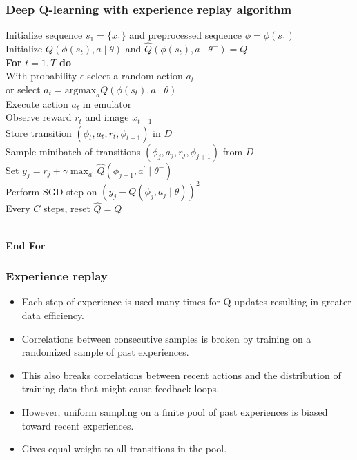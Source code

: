 \documentclass{beamer}
\begin{document}
\begin{frame}
  \frametitle{Deep Q-learning with experience replay algorithm}
  Initialize sequence \(s_1=\{x_1\}\) and preprocessed sequence \(\phi=\phi(s_1)\) \\
  Initialize \(Q(\phi(s_t),a\mid\theta)\) and \(\hat{Q}(\phi(s_t),a\mid\theta^-)=Q\) \\
  \textbf{For} \(t=1, T\) \textbf{do}
  \\ \hspace*{20pt} With probability \(\epsilon\) select a random action \(a_t\)
  \\ \hspace*{40pt} or select \(a_t=\text{argmax}_a Q(\phi(s_t),a\mid\theta)\)
  \\ \hspace*{20pt} Execute action \(a_t\) in emulator
  \\ \hspace*{20pt} Observe reward \(r_t\) and image \(x_{t+1}\)
  \\ \hspace*{20pt} Store transition \((\phi_t, a_t, r_t, \phi_{t+1})\) in \(D\)
  \\ \hspace*{20pt} Sample minibatch of transitions \((\phi_j, a_j, r_j, \phi_{j+1})\) from \(D\)
  \\ \hspace*{20pt} Set \(y_j = r_j+\gamma\max_{a^\prime}\hat{Q}(\phi_{j+1},a^\prime\mid\theta^-)\)
  \\ \hspace*{20pt} Perform SGD step on \((y_j-Q(\phi_j,a_j\mid\theta))^2\)
  \\ \hspace*{20pt} Every \(C\) steps, reset \(\hat{Q}=Q\)

  \\ \textbf{End For}
\end{frame}

\begin{frame}
  \frametitle{Experience replay}
  \begin{itemize}
  \item Each step of experience is used many times for Q updates resulting in
    greater data efficiency.
  \item Correlations between consecutive samples is broken by training on a
    randomized sample of past experiences.
  \item This also breaks correlations between recent actions and the
    distribution of training data that might cause feedback loops.
  \item However, uniform sampling on a finite pool of past experiences
    is biased toward recent experiences.
  \item Gives equal weight to all transitions in the pool.
  \end{itemize}
\end{frame}
\end{document}
